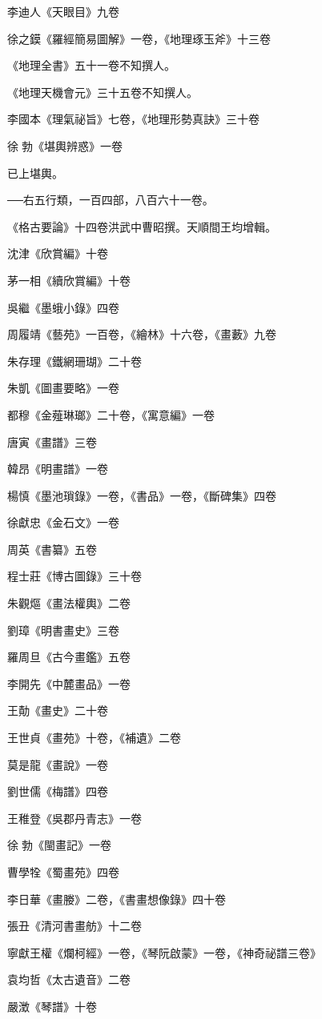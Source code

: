 李迪人《天眼目》九卷

徐之鏌《羅經簡易圖解》一卷，《地理琢玉斧》十三卷

《地理全書》五十一卷不知撰人。

《地理天機會元》三十五卷不知撰人。

李國本《理氣祕旨》七卷，《地理形勢真訣》三十卷

徐勃《堪輿辨惑》一卷

已上堪輿。

──右五行類，一百四部，八百六十一卷。

《格古要論》十四卷洪武中曹昭撰。天順間王均增輯。

沈津《欣賞編》十卷

茅一相《續欣賞編》十卷

吳繼《墨蛾小錄》四卷

周履靖《藝苑》一百卷，《繪林》十六卷，《畫藪》九卷

朱存理《鐵網珊瑚》二十卷

朱凱《圖畫要略》一卷

都穆《金薤琳瑯》二十卷，《寓意編》一卷

唐寅《畫譜》三卷

韓昂《明畫譜》一卷

楊慎《墨池瑣錄》一卷，《書品》一卷，《斷碑集》四卷

徐獻忠《金石文》一卷

周英《書纂》五卷

程士莊《博古圖錄》三十卷

朱觀熰《畫法權輿》二卷

劉璋《明書畫史》三卷

羅周旦《古今畫鑑》五卷

李開先《中麓畫品》一卷

王勣《畫史》二十卷

王世貞《畫苑》十卷，《補遺》二卷

莫是龍《畫說》一卷

劉世儒《梅譜》四卷

王稚登《吳郡丹青志》一卷

徐勃《閩畫記》一卷

曹學牷《蜀畫苑》四卷

李日華《畫媵》二卷，《書畫想像錄》四十卷

張丑《清河書畫舫》十二卷

寧獻王權《爛柯經》一卷，《琴阮啟蒙》一卷，《神奇祕譜三卷》

袁均哲《太古遺音》二卷

嚴澂《琴譜》十卷

